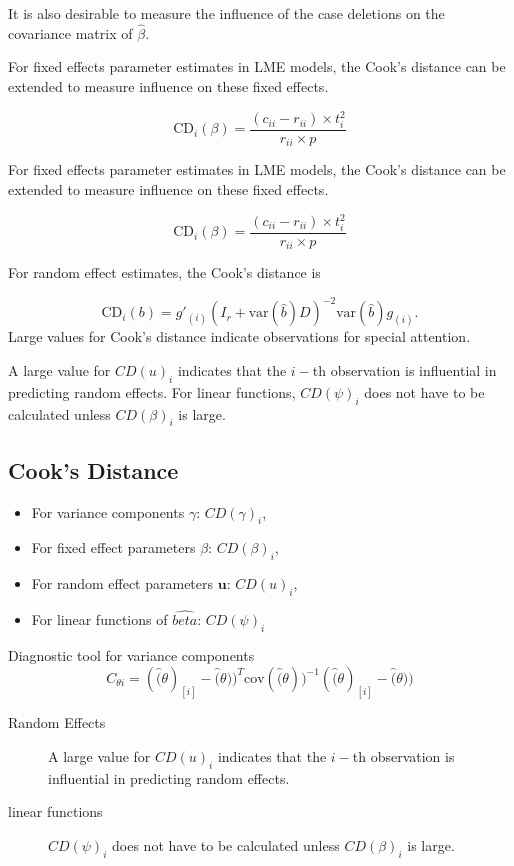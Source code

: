 \documentclass[12pt, a4paper]{report}
\theoremstyle{plain}
\theoremstyle{definition}
\theoremstyle{remark}
\begin{document}
It is also desirable to measure the influence of the case deletions on the covariance matrix of $\hat{\beta}$.

For fixed effects parameter estimates in LME models, the  Cook's distance can be extended to measure influence on these fixed effects.

\[
\mbox{CD}_{i}(\beta) = \frac{(c_{ii} - r_{ii}) \times t^2_{i}}{r_{ii} \times p}
\]


For fixed effects parameter estimates in LME models, the  Cook's distance can be extended to measure influence on these fixed effects.

\[
\mbox{CD}_{i}(\beta) = \frac{(c_{ii} - r_{ii}) \times t^2_{i}}{r_{ii} \times p}
\]

For random effect estimates, the  Cook's distance is

\[
\mbox{CD}_{i}(b) = g{\prime}_{(i)} (I_{r} + \mbox{var}(\hat{b})D)^{-2}\mbox{var}(\hat{b})g_{(i)}.
\]
Large values for Cook's distance indicate observations for special attention.

A large value for $CD(u)_i$ indicates that the $i-$th observation is influential in predicting random effects.
For linear functions, $CD(\psi)_i$ does not have to be calculated unless $CD(\beta)_i$ is large.


\subsection{Cook's Distance}
\begin{itemize}
	\item For variance components $\gamma$: $CD(\gamma)_i$,
	\item For fixed effect parameters $\beta$: $CD(\beta)_i$,
	\item For random effect parameters $\boldsymbol{u}$: $CD(u)_i$,
	\item For linear functions of $\hat{beta}$: $CD(\psi)_i$
\end{itemize}
Diagnostic tool for variance components
\[ C_{\theta i} =(\hat(\theta)_{[i]} - \hat(\theta))^{T}\mbox{cov}( \hat(\theta))^{-1}(\hat(\theta)_{[i]} - \hat(\theta))\]

\begin{description}
	\item[Random Effects]	
	A large value for $CD(u)_i$ indicates that the $i-$th observation is influential in predicting random effects.
	\item[linear functions]
	$CD(\psi)_i$ does not have to be calculated unless $CD(\beta)_i$ is large.
\end{description}
\end{document}
